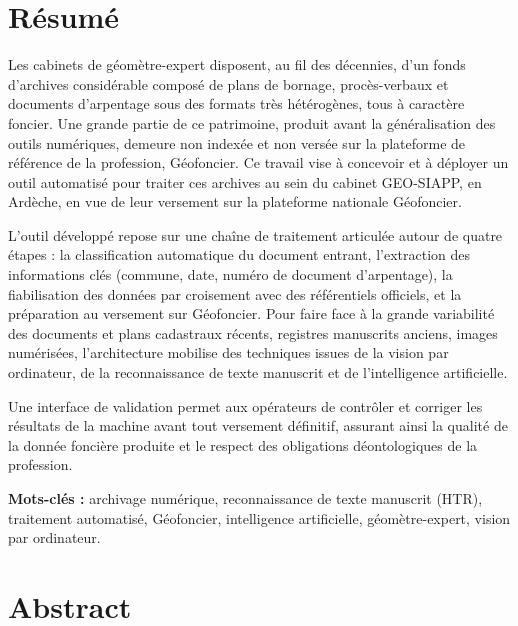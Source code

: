 
\section*{Résumé}

Les cabinets de géomètre-expert disposent, au fil des décennies, d'un fonds d'archives considérable composé de plans de bornage, procès-verbaux et documents d'arpentage sous des formats très hétérogènes, tous à caractère foncier. Une grande partie de ce patrimoine, produit avant la généralisation des outils numériques, demeure non indexée et non versée sur la plateforme de référence de la profession, Géofoncier. Ce travail vise à concevoir et à déployer un outil automatisé pour traiter ces archives au sein du cabinet GEO-SIAPP, en Ardèche, en vue de leur versement sur la plateforme nationale Géofoncier.

L'outil développé repose sur une chaîne de traitement
articulée autour de quatre étapes : la classification automatique du document entrant, l'extraction des informations clés (commune, date, numéro de document d'arpentage), la fiabilisation des données par croisement avec des référentiels officiels, et la préparation au versement sur Géofoncier. Pour faire face à la grande variabilité des documents et plans cadastraux récents, registres manuscrits anciens, images numérisées, l'architecture mobilise des techniques issues de la vision par ordinateur, de la reconnaissance de texte manuscrit et de l'intelligence artificielle.

Une interface de validation permet aux opérateurs de contrôler et corriger les résultats de la machine avant tout versement définitif, assurant ainsi la qualité de la donnée foncière produite et le respect des obligations déontologiques de la profession.

\vspace{1.5em}
\noindent\textbf{Mots-clés :} archivage numérique, reconnaissance de texte manuscrit (HTR), traitement automatisé, Géofoncier, intelligence artificielle, géomètre-expert, vision par ordinateur.

{\let\thefootnote\relax{}}

\clearpage

\section*{Abstract}

